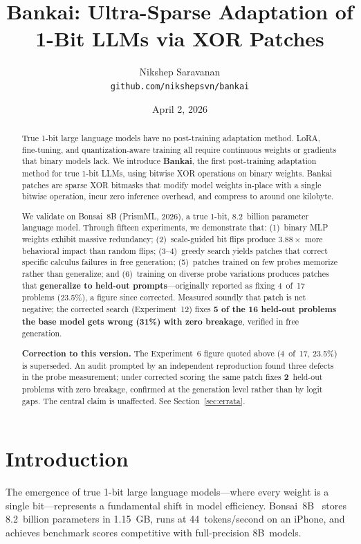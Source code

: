 \documentclass[11pt,a4paper]{article}
\title{Bankai: Ultra-Sparse Adaptation of 1-Bit LLMs via XOR Patches}
\author{
  Nikshep Saravanan \\
  \texttt{github.com/nikshepsvn/bankai}
}
\date{April 2, 2026}
\begin{document}
\maketitle

\begin{abstract}
True 1-bit large language models have no post-training adaptation method.
LoRA, fine-tuning, and quantization-aware training all require continuous
weights or gradients that binary models lack. We introduce \textbf{Bankai},
the first post-training adaptation method for true 1-bit LLMs, using
bitwise XOR operations on binary weights. Bankai patches are sparse XOR
bitmasks that modify model weights in-place with a single bitwise operation,
incur zero inference overhead, and compress to around one kilobyte.

We validate on Bonsai~8B (PrismML, 2026), a true 1-bit, 8.2~billion
parameter language model. Through fifteen experiments, we demonstrate that:
(1)~binary MLP weights exhibit massive redundancy;
(2)~scale-guided bit flips produce $3.88\times$ more behavioral impact
than random flips;
(3--4)~greedy search yields patches that correct specific calculus failures
in free generation;
(5)~patches trained on few probes memorize rather than generalize; and
(6)~training on diverse probe variations produces patches that
\textbf{generalize to held-out prompts}---originally reported as fixing
4~of~17 problems (23.5\%), a figure since corrected. Measured soundly that
patch is net negative; the corrected search (Experiment~12) fixes
\textbf{5 of the 16 held-out problems the base model gets wrong (31\%) with
zero breakage}, verified in free generation.

\medskip
\noindent\textbf{Correction to this version.} The Experiment~6 figure quoted
above (4~of~17, 23.5\%) is superseded. An audit prompted by an independent
reproduction found three defects in the probe measurement; under corrected
scoring the same patch fixes \textbf{2}~held-out problems with zero breakage,
confirmed at the generation level rather than by logit gaps. The central claim
is unaffected. See Section~\ref{sec:errata}.
\end{abstract}

\section{Introduction}

The emergence of true 1-bit large language models---where every weight is
a single bit---represents a fundamental shift in model efficiency.
Bonsai~8B~\citep{prismml2026} stores 8.2~billion parameters in 1.15~GB,
runs at 44~tokens/second on an iPhone, and achieves benchmark scores
competitive with full-precision 8B~models.
\end{document}
